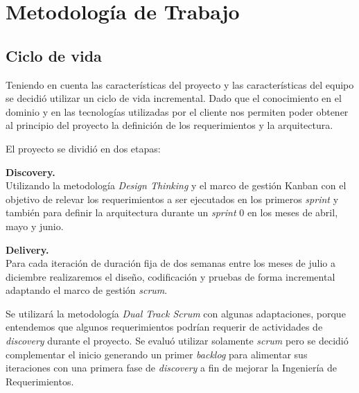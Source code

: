 \section{Metodología de Trabajo}\label{sec:metodologiaDeTrabajo}

\subsection{Ciclo de vida} 

Teniendo en cuenta las características del proyecto y las características del equipo se decidió utilizar un ciclo de vida 
incremental.  Dado que el conocimiento en el dominio y en las tecnologías utilizadas por el cliente nos permiten poder obtener 
al principio del proyecto la definición de los requerimientos y la arquitectura.

El proyecto se dividió en dos etapas:

\textbf{Discovery.}\\
Utilizando la metodología \textit{Design Thinking} y el marco de gestión Kanban con el objetivo de relevar los requerimientos a ser ejecutados 
en los primeros \textit{sprint} y también para definir la arquitectura durante un \textit{sprint} 0 en los meses de abril, mayo y junio. 

\textbf{Delivery.}\\
Para cada iteración de duración fija de dos semanas entre los meses de julio a diciembre realizaremos el diseño, codificación y pruebas de forma 
incremental adaptando el marco de gestión \textit{scrum}.

Se utilizará la metodología \textit{Dual Track Scrum} con algunas adaptaciones, porque entendemos que algunos requerimientos podrían requerir de actividades 
de \textit{discovery} durante el proyecto. Se evaluó utilizar solamente \textit{scrum} pero se decidió complementar el inicio generando un primer \textit{backlog} para 
alimentar sus iteraciones con una primera fase de \textit{discovery} a fin de mejorar la Ingeniería de Requerimientos.